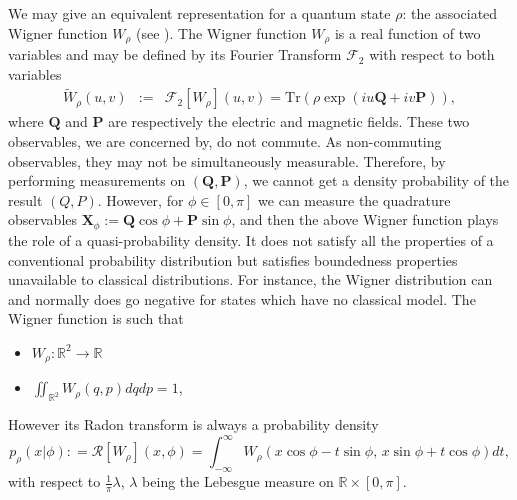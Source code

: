\documentclass[a4paper]{amsart}
\newcommand{\R}{\mathbb{R}}
\newcommand{\deq}{\mathrel{\mathop:} = } %
\begin{document}
We may give  an equivalent  representation for a quantum state $\rho$:  the
associated Wigner function $W_\rho$ (see \cite{Wigner}). The Wigner function
$W_\rho$  is a real function of two variables and may be defined by its Fourier
Transform $\mathcal{F}_2$ with respect to both variables
        \begin{eqnarray*}
         \label{def.Wigner}        
\widetilde{W}_{\rho}(u,v)&:=&\mathcal{F}_2[W_\rho](u,v)=\text{Tr}
\left(\rho\exp(iu\textbf{Q}+iv        
         \textbf{P})\right),
         \end{eqnarray*}
where $\textbf{Q}$ and $\textbf{P}$ are respectively the electric and magnetic
fields.  These two observables, we are concerned by, do not commute. As
non-commuting observables,  they may not be simultaneously measurable. Therefore,
by performing measurements on $(\textbf{Q},\textbf{P})$, we cannot get a density
probability of the result $(Q,P)$.  However, for $\phi\in[0,\pi]$ we can measure
the quadrature observables $\mathbf{X}_\phi :=\mathbf{Q}\cos \phi
+\mathbf{P}\sin \phi$, and then the above Wigner function plays the role of a
quasi-probability density. It does not satisfy all the properties of a
conventional probability distribution but satisfies boundedness properties
unavailable to classical distributions. For instance, the Wigner distribution
can and normally does go negative for states which have no classical model. The
Wigner function is such that
%        
        \begin{itemize}
        \item $W_\rho:\mathbb{R}^2\rightarrow\mathbb{R}$
        \item $\iint_{\R^2} W_\rho(q,p)dqdp=1$,
        \end{itemize}
%        
 However its Radon transform is always a probability density
        \begin{equation}
        \label{eq.Radon.transform}
         p_\rho(x|\phi)   \deq
\mathcal{R}[W_{\rho}](x,\phi)=\int_{-\infty}^\infty W_{\rho}(
        x\cos\phi - t\sin\phi, \, x \sin\phi + t\cos\phi )dt,
         \end{equation}
%         
with respect to $\frac{1}{\pi}\lambda$, $\lambda$ being the Lebesgue measure on
$\mathbb{R}\times [0,\pi]$. 

 
\bigskip
\end{document}
